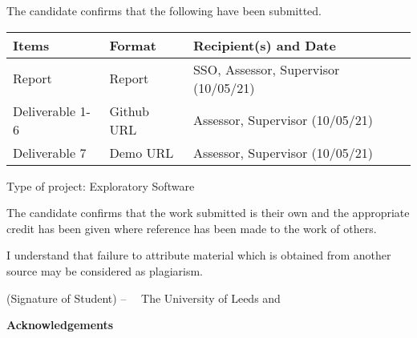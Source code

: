 \frontcover

\clearpage
\noindent The candidate confirms that the following have been submitted.

\begin{center}
    \begin{tabular}{|l|l|l|}
        \hline 
        \bf{Items} & \bf{Format} & \bf{Recipient(s) and Date} \\ \hline
        Report & Report & SSO, Assessor, Supervisor (10/05/21) \\ \hline
        Deliverable 1-6 & Github URL & Assessor, Supervisor (10/05/21) \\ \hline 
        Deliverable 7 & Demo URL & Assessor, Supervisor (10/05/21) \\ \hline 
    \end{tabular} 
\end{center}

\noindent Type of project: Exploratory Software
\vspace{\fill}

\noindent The candidate confirms that the work submitted is their own and the appropriate credit has been given where reference has been made to the work of others.
\vspace{\fill}

\noindent I understand that failure to attribute material which is obtained from another source may be considered as plagiarism.

\vspace{\fill}
\flushright(Signature of Student) -- \fullname
\flushleft
\vspace{\fill}
\textcopyright~\session~The University of Leeds and~\fullname

\begin{dissertationsummary}

\end{dissertationsummary}

\clearpage
\centering\textbf{Acknowledgements}
\flushleft


\tableofcontents


